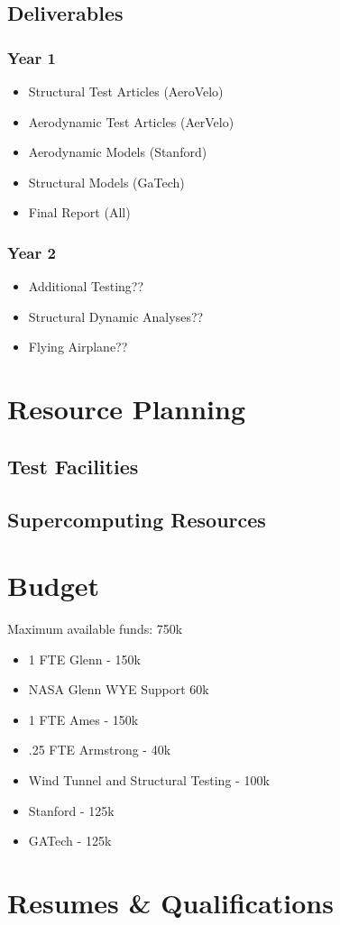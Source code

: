 \documentclass[]{aiaa-tc}
\begin{document}
    \subsection{Deliverables}
        \subsubsection{Year 1}
            \begin{itemize}
                \item Structural Test Articles (AeroVelo)
                \item Aerodynamic Test Articles (AerVelo)
                \item Aerodynamic Models (Stanford)
                \item Structural Models (GaTech)
                \item Final Report (All)
            \end{itemize}
        \subsubsection{Year 2}
            \begin{itemize}
                \item Additional Testing?? 
                \item Structural Dynamic Analyses?? 
                \item Flying Airplane??
            \end{itemize}

  \section{Resource Planning}
    \subsection{Test Facilities}
    \subsection{Supercomputing Resources}

  \appendix

  \section{Budget}
    Maximum available funds: 750k 
    \begin{itemize}
        \item 1 FTE Glenn - 150k 
        \item NASA Glenn WYE Support 60k 
        \item 1 FTE Ames - 150k 
        \item .25 FTE Armstrong - 40k
        \item Wind Tunnel and Structural Testing - 100k 
        \item Stanford - 125k 
        \item GATech - 125k
    \end{itemize}

  \section{Resumes \& Qualifications}


  
\end{document}

